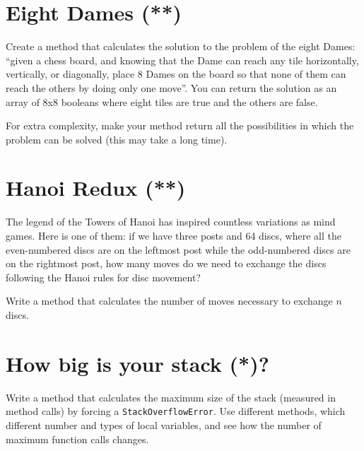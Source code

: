\documentclass{article}
\begin{document}
\section{Eight Dames (**)}
\label{sec:eight-dames}

Create a method that calculates the solution to the problem of the
eight Dames: ``given a chess board, and knowing that the Dame can reach
any tile horizontally, vertically, or diagonally, place 8 Dames on the
board so that none of them can reach the others by doing only one
move''. You can return the solution as an array of 8x8 booleans where
eight tiles are true and the others are false. 

For extra complexity, make your method return all the possibilities in
which the problem can be solved (this may take a long time). 

\section{Hanoi Redux (**)}
\label{sec:hanoi-redux}

The legend of the Towers of Hanoi has inspired countless variations as
mind games. Here is one of them: if we have three posts and 64 discs,
where all the even-numbered discs are on the leftmost post while the
odd-numbered discs are on the rightmost post, how many moves do we
need to exchange the discs following the Hanoi rules for disc
movement? 

Write a method that calculates the number of moves necessary to
exchange $n$ discs. 

\section{How big is your stack (*)?}
\label{sec:how-big-your}

Write a method that calculates the maximum size of the stack (measured
in method calls) by forcing a \verb+StackOverflowError+. Use different
methods, which different number and types of local variables, and see
how the number of maximum function calls changes.

\end{document}
